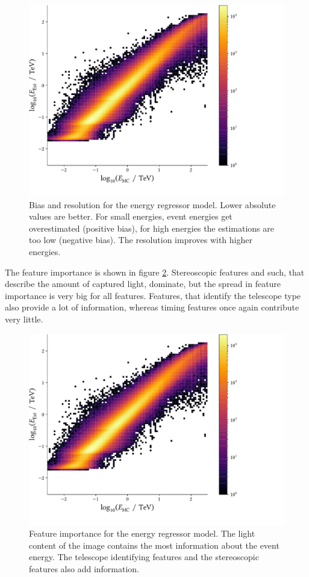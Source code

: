 \begin{figure}
    \centering
    \captionsetup{width=0.\textwidth}
    \includegraphics[page=3, width=.8\textwidth]{../analysis/plots/gamma_reg_perf_plot.pdf}
    \caption{Bias and resolution for the energy regressor model. 
    Lower absolute values are better. For small energies, 
    event energies get overestimated (positive bias), for high energies the estimations are too low (negative bias).
    The resolution improves with higher energies.}
    \label{fig:energy_bias_res}
\end{figure}

The feature importance is shown in figure \ref{fig:gh_features}.
Stereoscopic features and such, that describe the amount of
captured light, dominate, but the
spread in feature importance is very big for all features.
Features, that identify the telescope type also provide a lot of 
information, whereas timing features once again contribute very little.

\begin{figure}
    \centering
    \captionsetup{width=0.9\textwidth}
    \hspace*{-0.15\textwidth}\includegraphics[page=4, width=.8\textwidth]{../analysis/plots/gamma_reg_perf_plot.pdf}
    \caption{Feature importance for the energy regressor model. The light content of the image contains the most
    information about the event energy. The telescope identifying features and the
    stereoscopic features also add information.}
    \label{fig:gh_features}
\end{figure}
